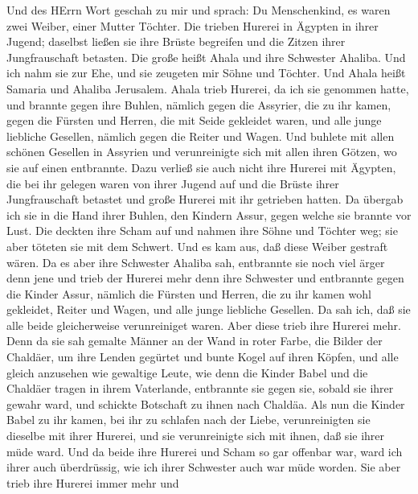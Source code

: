  Und des HErrn Wort geschah zu mir und sprach: 
Du Menschenkind, es waren zwei Weiber, einer Mutter Töchter.
 Die trieben Hurerei in Ägypten in ihrer Jugend; daselbst
ließen sie ihre Brüste begreifen und die Zitzen ihrer Jungfrauschaft
betasten.  Die große heißt Ahala und ihre Schwester Ahaliba.
Und ich nahm sie zur Ehe, und sie zeugeten mir Söhne und Töchter. Und
Ahala heißt Samaria und Ahaliba Jerusalem.  Ahala trieb
Hurerei, da ich sie genommen hatte, und brannte gegen ihre Buhlen,
nämlich gegen die Assyrier, die zu ihr kamen,  gegen die
Fürsten und Herren, die mit Seide gekleidet waren, und alle junge
liebliche Gesellen, nämlich gegen die Reiter und Wagen.  Und
buhlete mit allen schönen Gesellen in Assyrien und verunreinigte sich
mit allen ihren Götzen, wo sie auf einen entbrannte.  Dazu
verließ sie auch nicht ihre Hurerei mit Ägypten, die bei ihr gelegen
waren von ihrer Jugend auf und die Brüste ihrer Jungfrauschaft betastet
und große Hurerei mit ihr getrieben hatten.  Da übergab ich
sie in die Hand ihrer Buhlen, den Kindern Assur, gegen welche sie
brannte vor Lust.  Die deckten ihre Scham auf und nahmen
ihre Söhne und Töchter weg; sie aber töteten sie mit dem Schwert. Und es
kam aus, daß diese Weiber gestraft wären.  Da es aber ihre
Schwester Ahaliba sah, entbrannte sie noch viel ärger denn jene und
trieb der Hurerei mehr denn ihre Schwester  und entbrannte
gegen die Kinder Assur, nämlich die Fürsten und Herren, die zu ihr kamen
wohl gekleidet, Reiter und Wagen, und alle junge liebliche Gesellen.
 Da sah ich, daß sie alle beide gleicherweise verunreiniget
waren.  Aber diese trieb ihre Hurerei mehr. Denn da sie sah
gemalte Männer an der Wand in roter Farbe, die Bilder der Chaldäer,
 um ihre Lenden gegürtet und bunte Kogel auf ihren Köpfen,
und alle gleich anzusehen wie gewaltige Leute, wie denn die Kinder Babel
und die Chaldäer tragen in ihrem Vaterlande,  entbrannte
sie gegen sie, sobald sie ihrer gewahr ward, und schickte Botschaft zu
ihnen nach Chaldäa.  Als nun die Kinder Babel zu ihr kamen,
bei ihr zu schlafen nach der Liebe, verunreinigten sie dieselbe mit
ihrer Hurerei, und sie verunreinigte sich mit ihnen, daß sie ihrer müde
ward.  Und da beide ihre Hurerei und Scham so gar offenbar
war, ward ich ihrer auch überdrüssig, wie ich ihrer Schwester auch war
müde worden.  Sie aber trieb ihre Hurerei immer mehr und
